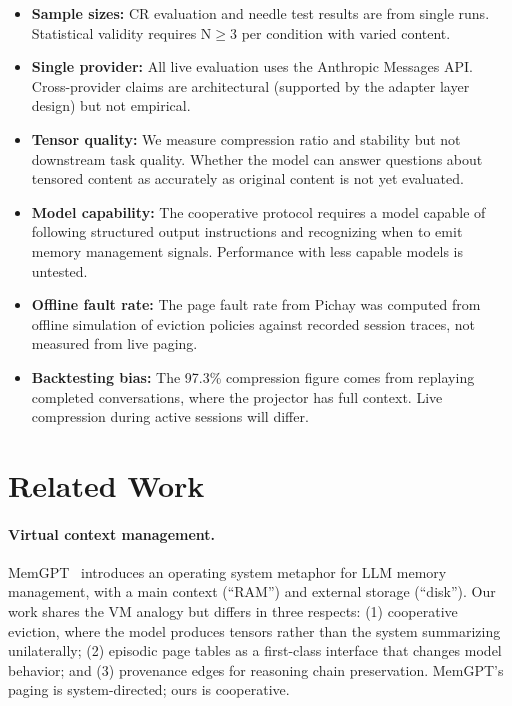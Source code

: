 \documentclass[sigplan,screen,anonymous]{acmart}
\begin{document}
\begin{itemize}
\item \textbf{Sample sizes:} CR evaluation and needle test results
  are from single runs. Statistical validity requires N$\geq$3 per
  condition with varied content.

\item \textbf{Single provider:} All live evaluation uses the
  Anthropic Messages API. Cross-provider claims are architectural
  (supported by the adapter layer design) but not empirical.

\item \textbf{Tensor quality:} We measure compression ratio and
  stability but not downstream task quality. Whether the model can
  answer questions about tensored content as accurately as original
  content is not yet evaluated.

\item \textbf{Model capability:} The cooperative protocol requires a
  model capable of following structured output instructions and
  recognizing when to emit memory management signals. Performance
  with less capable models is untested.

\item \textbf{Offline fault rate:} The page fault rate from Pichay
  was computed from offline simulation of eviction policies against
  recorded session traces, not measured from live paging.

\item \textbf{Backtesting bias:} The 97.3\% compression figure comes
  from replaying completed conversations, where the projector has full
  context. Live compression during active sessions will differ.
\end{itemize}


\section{Related Work}

\paragraph{Virtual context management.}
MemGPT~\cite{packer2023memgpt} introduces an operating system
metaphor for LLM memory management, with a main context (``RAM'')
and external storage (``disk''). Our work shares the VM analogy but
differs in three respects: (1) cooperative eviction, where the model
produces tensors rather than the system summarizing unilaterally;
(2) episodic page tables as a first-class interface that changes model
behavior; and (3) provenance edges for reasoning chain preservation.
MemGPT's paging is system-directed; ours is cooperative.
\end{document}
